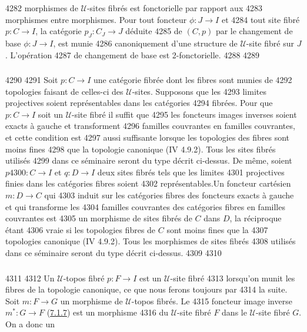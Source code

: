   4282	morphismes de $𝒰$-sites fibrés est fonctorielle par rapport aux
  4283	morphismes entre morphismes. Pour tout foncteur $\phi : J \to I$ et
  4284	tout site fibré $p : C \to I$, la catégorie $p_J : C_J \to J$ déduite
  4285	de $(C, p)$ par le changement de base $\phi : J \to I$, est munie
  4286	canoniquement d'une structure de $𝒰$-site fibré sur $J$. L'opération
  4287	de changement de base est 2-fonctorielle.
  4288	
  4289	\subsubsection{}
  4290	
  4291	Soit $p : C \to I$ une catégorie fibrée dont les fibres sont munies de
  4292	topologies faisant de celles-ci des $𝒰$-sites. Supposons que les
  4293	limites projectives soient représentables dans les catégories
  4294	fibrées. Pour que $p : C \to I$ soit un $𝒰$-site fibré il suffit que
  4295	les foncteurs images inverses soient exacts à gauche et transforment
  4296	familles couvrantes en familles couvrantes, et cette condition est
  4297	aussi suffisante lorsque les topologies des fibres sont moins fines
  4298	que la topologie canonique (IV 4.9.2). Tous les sites fibrés utilisés
  4299	dans ce séminaire seront du type décrit ci-dessus. De même, soient $p
  4300	: C \to I$ et $q : D \to I$ deux sites fibrés tels que les limites
  4301	projectives finies dans les catégories fibres soient
  4302	représentables.\pageoriginale Un foncteur cartésien $m : D \to C$ qui
  4303	induit sur les catégories fibres des foncteurs exacts à gauche et qui transforme les
  4304	familles couvrantes des catégories fibres en familles couvrantes est
  4305	un morphisme de sites fibrés de $C$ dans $D$, la réciproque étant
  4306	vraie si les topologies fibres de $C$ sont moins fines que la
  4307	topologies canonique (IV 4.9.2). Tous les morphismes de sites fibrés
  4308	utilisés dans ce séminaire seront du type décrit ci-dessus.
  4309	
  4310	\subsubsection{}
  4311	
  4312	Un $𝒰$-topos fibré $p : F \to I$ est un $𝒰$-site fibré
  4313	lorsqu'on munit les fibres de la topologie canonique, ce que nous ferons toujours par
  4314	la suite. Soit $m:  F \to G$ un morphisme de $𝒰$-topos fibrés. Le
  4315	foncteur image inverse $m^{\ast} : G \to F$ (\hyperref[VI.subsubsec7.1.7]{7.1.7}) est un morphisme
  4316	du $𝒰$-site fibré $F$ dans le $𝒰$-site fibré $G$. On a donc un
